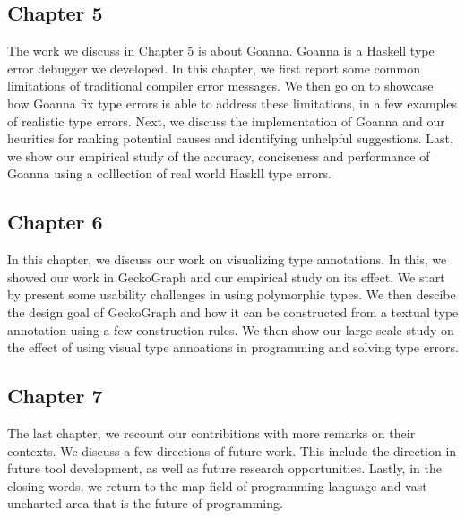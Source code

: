 \subsection{Chapter 5}

The work we discuss in Chapter 5 is about Goanna. Goanna is a Haskell type error debugger we developed. In this chapter, we first report some common limitations of traditional compiler error messages. We then go on to showcase how Goanna fix type errors is able to address these limitations, in a few examples of realistic type errors.  Next, we discuss the implementation of Goanna and our heuritics for ranking potential causes and identifying unhelpful suggestions. Last, we show our empirical study of the accuracy, conciseness and performance of Goanna using a colllection of real world Haskll type errors. 

\subsection{Chapter 6}

In this chapter, we discuss our work on visualizing type annotations. In this, we showed our work in GeckoGraph and our empirical study on its effect. We start by present some usability challenges in using polymorphic types. We then descibe the design goal of GeckoGraph and how it can be constructed from a textual type annotation using a few construction rules. We then show our large-scale study on the effect of using visual type annoations in programming and solving type errors. 


\subsection{Chapter 7}

The last chapter, we recount our contribitions with more remarks on their contexts. We discuss a few directions of future work. This include the direction in future tool development, as well as future research opportunities. Lastly, in the closing words, we return to the map field of programming language and vast uncharted area that is the future of programming. 